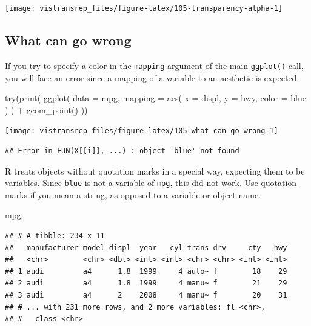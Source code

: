 \documentclass[]{book}
\newenvironment{Shaded}{}{}
\newcommand{\DataTypeTok}[1]{#1}
\newcommand{\KeywordTok}[1]{\textcolor[rgb]{0.00,0.00,1.00}{#1}}
\newcommand{\NormalTok}[1]{#1}
\newcommand{\OperatorTok}[1]{#1}
\newcommand{\StringTok}[1]{\textcolor[rgb]{0.00,0.50,0.50}{#1}}
\begin{document}
\begin{flushright}\texttt{[image: vistransrep\_files/figure-latex/105-transparency-alpha-1]} \end{flushright}

\hypertarget{what-can-go-wrong}{%
\subsection{What can go wrong}\label{what-can-go-wrong}}

If you try to specify a color in the \texttt{mapping}-argument of the main \texttt{ggplot()} call, you will face an error since a mapping of a variable to an aesthetic is expected.

\begin{Shaded}
\begin{Highlighting}[]
\KeywordTok{try}\NormalTok{(}\KeywordTok{print}\NormalTok{(}
  \KeywordTok{ggplot}\NormalTok{(}
    \DataTypeTok{data =}\NormalTok{ mpg,}
    \DataTypeTok{mapping =} \KeywordTok{aes}\NormalTok{(}
      \DataTypeTok{x =}\NormalTok{ displ,}
      \DataTypeTok{y =}\NormalTok{ hwy,}
      \DataTypeTok{color =}\NormalTok{ blue}
\NormalTok{    )}
\NormalTok{  ) }\OperatorTok{+}
\StringTok{    }\KeywordTok{geom_point}\NormalTok{()}
\NormalTok{))}
\end{Highlighting}
\end{Shaded}

\begin{flushright}\texttt{[image: vistransrep\_files/figure-latex/105-what-can-go-wrong-1]} \end{flushright}

\begin{verbatim}
## Error in FUN(X[[i]], ...) : object 'blue' not found
\end{verbatim}

R treats objects without quotation marks in a special way, expecting them to be variables.
Since \texttt{blue} is not a variable of \texttt{mpg}, this did not work.
Use quotation marks if you mean a string, as opposed to a variable or object name.

\begin{Shaded}
\begin{Highlighting}[]
\NormalTok{mpg}
\end{Highlighting}
\end{Shaded}

\begin{verbatim}
## # A tibble: 234 x 11
##   manufacturer model displ  year   cyl trans drv     cty   hwy
##   <chr>        <chr> <dbl> <int> <int> <chr> <chr> <int> <int>
## 1 audi         a4      1.8  1999     4 auto~ f        18    29
## 2 audi         a4      1.8  1999     4 manu~ f        21    29
## 3 audi         a4      2    2008     4 manu~ f        20    31
## # ... with 231 more rows, and 2 more variables: fl <chr>,
## #   class <chr>
\end{verbatim}
\end{document}
